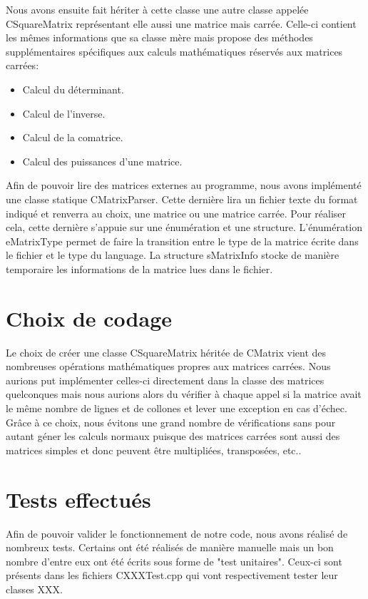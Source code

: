 		Nous avons ensuite fait hériter à cette classe une autre classe appelée CSquareMatrix représentant elle aussi une matrice mais carrée. Celle-ci contient les mêmes informations que sa classe mère mais propose des méthodes supplémentaires spécifiques aux calculs mathématiques réservés aux matrices carrées:
		\begin{itemize}
			\item Calcul du déterminant.
			\item Calcul de l'inverse.
			\item Calcul de la comatrice.
			\item Calcul des puissances d'une matrice.
		\end{itemize}
		
		Afin de pouvoir lire des matrices externes au programme, nous avons implémenté une classe statique CMatrixParser. Cette dernière lira un fichier texte du format indiqué et renverra au choix, une matrice ou une matrice carrée. Pour réaliser cela, cette dernière s'appuie sur une énumération et une structure. L'énumération eMatrixType permet de faire la transition entre le type de la matrice écrite dans le fichier et le type du language. La structure sMatrixInfo stocke de manière temporaire les informations de la matrice lues dans le fichier. 
		
	\chapter{Choix de codage}
		Le choix de créer une classe CSquareMatrix héritée de CMatrix vient des nombreuses opérations mathématiques propres aux matrices carrées. Nous aurions put implémenter celles-ci directement dans la classe des matrices quelconques mais nous aurions alors du vérifier à chaque appel si la matrice avait le même nombre de lignes et de collones et lever une exception en cas d'échec.
		Grâce à ce choix, nous évitons une grand nombre de vérifications sans pour autant géner les calculs normaux puisque des matrices carrées sont aussi des matrices simples et donc peuvent être multipliées, transposées, etc..
	
	
	\chapter{Tests effectués}
		Afin de pouvoir valider le fonctionnement de notre code, nous avons réalisé de nombreux tests. Certains ont été réalisés de manière manuelle mais un bon nombre d'entre eux ont été écrits sous forme de "test unitaires". Ceux-ci sont présents dans les fichiers CXXXTest.cpp qui vont respectivement tester leur classes XXX.
		
